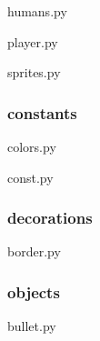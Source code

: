 \documentclass[a4paper, 11pt]{report}
\begin{document}
humans.py


player.py


sprites.py


\subsubsection{constants}

colors.py


const.py


\subsubsection{decorations}
border.py


\subsubsection{objects}
bullet.py

\end{document}
